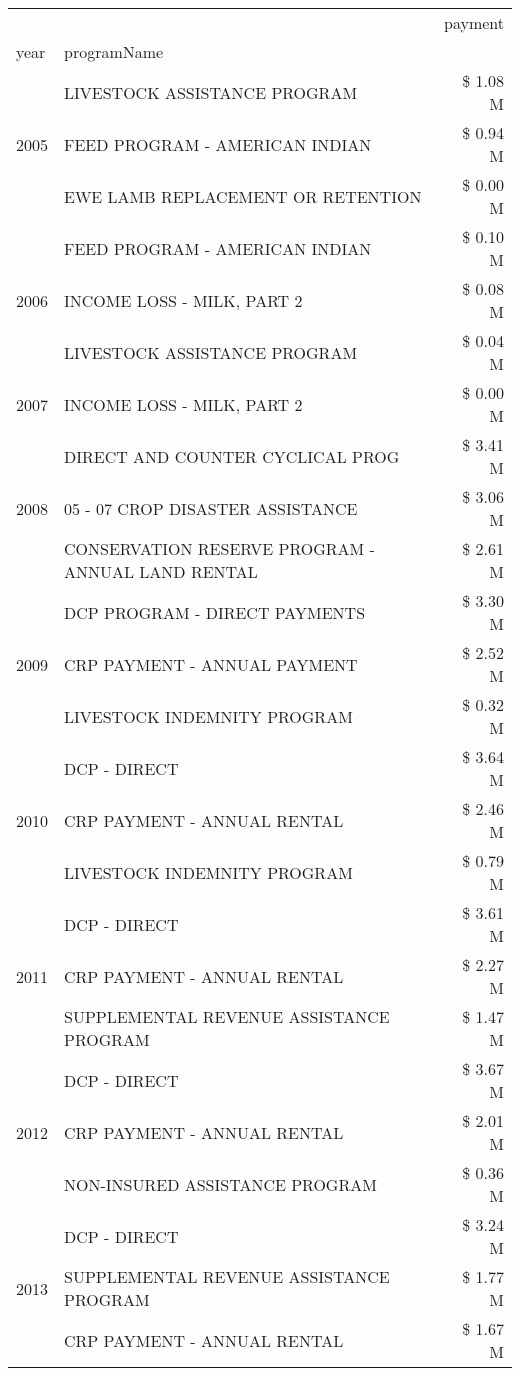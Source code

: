 \begin{tabular}{llr}
\toprule
 &  & payment \\
year & programName &  \\
\midrule
\multirow[t]{3}{*}{2005} & LIVESTOCK ASSISTANCE PROGRAM & \$ 1.08 M \\
 & FEED PROGRAM - AMERICAN INDIAN & \$ 0.94 M \\
 & EWE LAMB REPLACEMENT OR RETENTION & \$ 0.00 M \\
\cline{1-3}
\multirow[t]{3}{*}{2006} & FEED PROGRAM - AMERICAN INDIAN & \$ 0.10 M \\
 & INCOME LOSS - MILK, PART 2 & \$ 0.08 M \\
 & LIVESTOCK ASSISTANCE PROGRAM & \$ 0.04 M \\
\cline{1-3}
2007 & INCOME LOSS - MILK, PART 2 & \$ 0.00 M \\
\cline{1-3}
\multirow[t]{3}{*}{2008} & DIRECT AND COUNTER CYCLICAL PROG & \$ 3.41 M \\
 & 05 - 07 CROP DISASTER ASSISTANCE & \$ 3.06 M \\
 & CONSERVATION RESERVE PROGRAM - ANNUAL LAND RENTAL & \$ 2.61 M \\
\cline{1-3}
\multirow[t]{3}{*}{2009} & DCP PROGRAM - DIRECT PAYMENTS & \$ 3.30 M \\
 & CRP PAYMENT - ANNUAL PAYMENT & \$ 2.52 M \\
 & LIVESTOCK INDEMNITY PROGRAM & \$ 0.32 M \\
\cline{1-3}
\multirow[t]{3}{*}{2010} & DCP - DIRECT & \$ 3.64 M \\
 & CRP PAYMENT - ANNUAL RENTAL & \$ 2.46 M \\
 & LIVESTOCK INDEMNITY PROGRAM & \$ 0.79 M \\
\cline{1-3}
\multirow[t]{3}{*}{2011} & DCP - DIRECT & \$ 3.61 M \\
 & CRP PAYMENT - ANNUAL RENTAL & \$ 2.27 M \\
 & SUPPLEMENTAL REVENUE ASSISTANCE PROGRAM & \$ 1.47 M \\
\cline{1-3}
\multirow[t]{3}{*}{2012} & DCP - DIRECT & \$ 3.67 M \\
 & CRP PAYMENT - ANNUAL RENTAL & \$ 2.01 M \\
 & NON-INSURED ASSISTANCE PROGRAM & \$ 0.36 M \\
\cline{1-3}
\multirow[t]{3}{*}{2013} & DCP - DIRECT & \$ 3.24 M \\
 & SUPPLEMENTAL REVENUE ASSISTANCE PROGRAM & \$ 1.77 M \\
 & CRP PAYMENT - ANNUAL RENTAL & \$ 1.67 M \\

\end{tabular}
